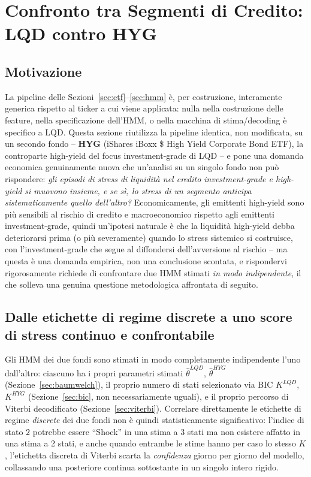 \documentclass[11pt]{article}
\theoremstyle{definition}
\theoremstyle{remark}
\begin{document}
\section{Confronto tra Segmenti di Credito: LQD contro HYG}
\label{sec:crossetf}

\subsection{Motivazione}

La pipeline delle Sezioni~\ref{sec:etf}--\ref{sec:hmm} \`e, per costruzione, interamente generica rispetto al ticker a cui viene applicata: nulla nella costruzione delle feature, nella specificazione dell'HMM, o nella macchina di stima/decoding \`e specifico a LQD. Questa sezione riutilizza la pipeline identica, non modificata, su un secondo fondo -- \textbf{HYG} (iShares iBoxx \$ High Yield Corporate Bond ETF), la controparte high-yield del focus investment-grade di LQD -- e pone una domanda economica genuinamente nuova che un'analisi su un singolo fondo non pu\`o rispondere: \emph{gli episodi di stress di liquidit\`a nel credito investment-grade e high-yield si muovono insieme, e se s\`i, lo stress di un segmento anticipa sistematicamente quello dell'altro?} Economicamente, gli emittenti high-yield sono pi\`u sensibili al rischio di credito e macroeconomico rispetto agli emittenti investment-grade, quindi un'ipotesi naturale \`e che la liquidit\`a high-yield debba deteriorarsi prima (o pi\`u severamente) quando lo stress sistemico si costruisce, con l'investment-grade che segue al diffondersi dell'avversione al rischio -- ma questa \`e una domanda empirica, non una conclusione scontata, e rispondervi rigorosamente richiede di confrontare due HMM stimati \emph{in modo indipendente}, il che solleva una genuina questione metodologica affrontata di seguito.

\subsection{Dalle etichette di regime discrete a uno score di stress continuo e confrontabile}
\label{sec:stress-score}

Gli HMM dei due fondi sono stimati in modo completamente indipendente l'uno dall'altro: ciascuno ha i propri parametri stimati $\widehat\theta^{LQD}$, $\widehat\theta^{HYG}$ (Sezione~\ref{sec:baumwelch}), il proprio numero di stati selezionato via BIC $K^{LQD}$, $K^{HYG}$ (Sezione~\ref{sec:bic}, non necessariamente uguali), e il proprio percorso di Viterbi decodificato (Sezione~\ref{sec:viterbi}). Correlare direttamente le etichette di regime \emph{discrete} dei due fondi non \`e quindi statisticamente significativo: l'indice di stato $2$ potrebbe essere ``Shock'' in una stima a 3 stati ma non esistere affatto in una stima a 2 stati, e anche quando entrambe le stime hanno per caso lo stesso $K$, l'etichetta discreta di Viterbi scarta la \emph{confidenza} giorno per giorno del modello, collassando una posteriore continua sottostante in un singolo intero rigido.
\end{document}
